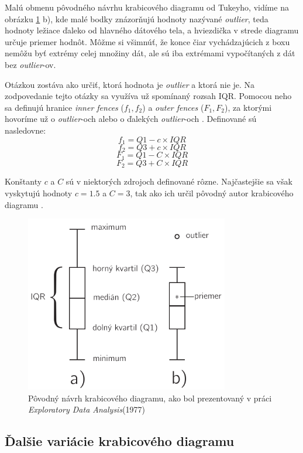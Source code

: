 Malú obmenu pôvodného návrhu krabicového diagramu od Tukeyho, vidíme na obrázku \ref{fig:boxplot} b), kde malé bodky znázorňujú hodnoty nazývané \textit{outlier}, teda hodnoty ležiace ďaleko od hlavného dátového tela, a hviezdička v strede diagramu určuje priemer hodnôt. Môžme si všimnúť, že konce čiar vychádzajúcich z boxu nemôžu byť extrémy celej množiny dát, ale sú iba extrémami vypočítaných z dát bez \mbox{\textit{outlier}-ov}.

Otázkou zostáva ako určiť, ktorá hodnota je \textit{outlier} a ktorá nie je. Na zodpovedanie tejto otázky sa využíva už spomínaný rozsah IQR. Pomocou neho sa definujú hranice \textit{inner fences} ($f_{1}, f_{2}$) a \textit{outer fences} ($F_{1}, F_{2}$), za ktorými hovoríme už o \mbox{\textit{outlier}-och} alebo o ďalekých \mbox{\textit{outlier}-och} \cite{Schwertman}. Definované sú nasledovne:
\\
\[f_{1} = Q1 - c \times IQR\]	
\[f_{2} = Q3 + c \times IQR\]
\[F_{1} = Q1 - C \times IQR\]
\[F_{2} = Q3 + C \times IQR\]

Konštanty $ c $ a $ C $ sú v niektorých zdrojoch definované rôzne. Najčastejšie sa však vyskytujú hodnoty $ c = 1.5 $ a $ C = 3$, tak ako ich určil pôvodný autor krabicového diagramu \cite{Tukey}.

\begin{figure}
	\centering
	\includegraphics[width = 3.5in]{boxplot}
	\caption{Pôvodný návrh krabicového diagramu, ako bol prezentovaný v práci \textit{Exploratory Data Analysis}(1977) \cite{Tukey} }
	\label{fig:boxplot}
\end{figure}


\subsection{Ďalšie variácie krabicového diagramu}

